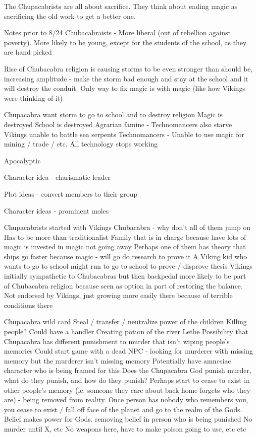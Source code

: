 \documentclass[blue]{GL2020}
\begin{document}
The Chupacabrists are all about sacrifice. They think about ending magic as sacrificing the old work to get a better one.

Notes prior to 8/24
Chubacabraists - More liberal (out of rebellion against poverty). More likely to be young, except for the students of the school, as they are hand picked

Rise of Chubacabra religion is causing storms to be even stronger than should be, increasing amplitude - make the storm bad enough and stay at the school and it will destroy the conduit.  Only way to fix magic is with magic (like how Vikings were thinking of it)

Chupacabra want storm to go to school and to destroy religion
Magic is destroyed
School is destroyed
Agrarian famine - Technomancers also starve
Vikings unable to battle sea serpents
Technomancers - Unable to use magic for mining / trade / etc.  All technology stops working

Apocalyptic

Character idea - charismatic leader

Plot ideas - convert members to their group

Character ideas - prominent moles

Chupacabrists started with Vikings
Chubacabra - why don’t all of them jump on
Has to be more than traditionalist
Family that is in charge because have lots of magic is invested in magic not going away
Perhaps one of them has theory that ships go faster because magic - will go do research to prove it
A Viking kid who wants to go to school might run to go to school to prove / disprove thesis
Vikings initially sympathetic to Chubacabras but then backpedal
more likely to be part of Chubacabra religion because seen as option in part of restoring the balance.  Not endorsed by Vikings, just growing more easily there because of terrible conditions there

Chupacabra wild card
Steal / transfer / neutralize power of the children
Killing people?  Could have a handler
Creating potion of the river Lethe
Possibility that Chupacabra has different punishment to murder that isn’t wiping people’s memories
Could start game with a dead NPC - looking for murderer with missing memory but the murderer isn’t missing memory
Potentially have amnesiac character who is being framed for this
Does the Chupacabra God punish murder, what do they punish, and how do they punish?
Perhaps start to cease to exist in other people’s memory (ie: someone they care about back home forgets who they are) - being removed from reality.  Once person has nobody who remembers you, you cease to exist / fall off face of the planet and go to the realm of the Gods.
Belief makes power for Gods, removing belief in person who is being punished
No murder until X, etc
No weapons here, have to make poison going to use, etc etc
\end{document}
